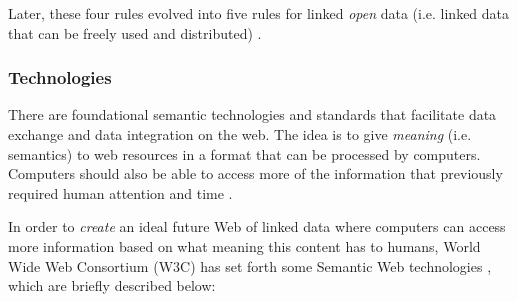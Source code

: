 \documentclass{article}
\begin{document}
Later, these four rules evolved into five rules for linked \emph{open} data (i.e. linked data that can be freely used and distributed) \cite{noauthor_5_nodate}.  

\subsubsection{Technologies}\label{subsubsec:Technologies}
There are foundational semantic technologies and standards that facilitate data exchange and data integration on the web. The idea is to give \emph{meaning} (i.e. semantics) to web resources in a format that can be processed by computers. Computers should also be able to access more of the information that previously required human attention and time \cite{hitzler_foundations_2009}.

In order to \emph{create} an ideal future Web of linked data where computers can access more information based on what meaning this content has to humans, World Wide Web Consortium (W3C) has set forth some Semantic Web technologies \cite{noauthor_semantic_nodate-1}, which are briefly described below:
\end{document}
